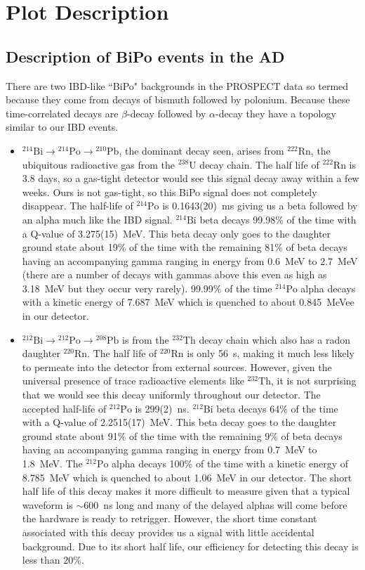 




\section{Plot Description}
\subsection{Description of BiPo events in the AD}
There are two IBD-like ``BiPo" backgrounds in the PROSPECT data so termed because they come from decays of bismuth followed by polonium. Because these time-correlated decays are $\beta$-decay followed by $\alpha$-decay they have a topology similar to our IBD events. 
\begin{itemize}
\item{$^{214}\textrm{Bi}\rightarrow$$^{214}\textrm{Po}\rightarrow$$^{210}\textrm{Pb}$, the dominant decay seen, arises from $^{222}$Rn, the ubiquitous radioactive gas from the $^{238}$U decay chain. The half life of $^{222}$Rn is 3.8 days, so a gas-tight detector would see this signal decay away within a few weeks. Ours is not gas-tight, so this BiPo signal does not completely disappear. The half-life of $^{214}\textrm{Po}$ is 0.1643(20)~ms giving us a beta followed by an alpha much like the IBD signal. $^{214}\textrm{Bi}$ beta decays 99.98\% of the time with a Q-value of 3.275(15)~MeV. This beta decay only goes to the daughter ground state about 19\% of the time with the remaining 81\% of beta decays having an accompanying gamma ranging in energy from 0.6~MeV to 2.7~MeV (there are a number of decays with gammas above this even as high as 3.18~MeV but they occur very rarely). 99.99\% of the time $^{214}$Po alpha decays with a kinetic energy of 7.687~MeV which is quenched to about 0.845~MeVee in our detector. }
\item{$^{212}\textrm{Bi}\rightarrow$$^{212}\textrm{Po}\rightarrow$$^{208}\textrm{Pb}$ is from the $^{232}$Th decay chain which also has a radon daughter $^{220}$Rn. The half life of $^{220}$Rn is only 56~s, making it much less likely to permeate into the detector from external sources. However, given the universal presence of trace radioactive elements like $^{232}$Th, it is not surprising that we would see this decay uniformly throughout our detector. The accepted half-life of $^{212}\textrm{Po}$ is 299(2)~ns. $^{212}\textrm{Bi}$ beta decays 64\% of the time with a Q-value of 2.2515(17)~MeV. This beta decay goes to the daughter ground state about 91\% of the time with the remaining 9\% of beta decays having an accompanying gamma ranging in energy from 0.7~MeV to 1.8~MeV. The  $^{212}\textrm{Po}$ alpha decays 100\% of the time with a kinetic energy of 8.785~MeV which is quenched to about 1.06~MeV in our detector. The short half life of this decay makes it more difficult to measure given that a typical waveform is $\sim$600~ns long and many of the delayed alphas will come before the hardware is ready to retrigger. However, the short time constant associated with this decay provides us a signal with little accidental background. Due to its short half life, our efficiency for detecting this decay is less than 20\%.}

\end{itemize}
